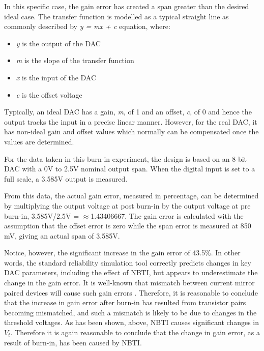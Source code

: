 \documentclass[11pt,a4paper]{article}
\begin{document}
In this specific case, the gain error has created a span greater than the desired ideal case. The transfer function is modelled as a typical straight line as commonly described by \textit{y = mx + c} equation, where:

\begin{itemize}
\item \textit{y} is the output of the DAC

\item  \textit{m} is the slope of the transfer function

\item  \textit{x} is the input of the DAC

\item  \textit{c} is the offset voltage
\end{itemize}

Typically, an ideal DAC has a gain, \textit{m}, of 1 and an offset, \textit{c}, of 0 and hence the output tracks the input in a precise linear manner. However, for the real DAC, it has non-ideal gain and offset values which normally can be compensated once the values are determined.

For the data taken in this burn-in experiment, the design is based on an 8-bit DAC with a 0V to 2.5V nominal output span. When the digital input is set to a full scale, a 3.585V output is measured.

From this data, the actual gain error, measured in percentage, can be determined by multiplying the output voltage at post burn-in by the output voltage at pre burn-in, 3.585V/2.5V = $\approx$1.43406667. The gain error is calculated with the assumption that the offset error is zero while the span error is measured at 850 mV, giving an actual span of 3.585V.

Notice, however, the significant increase in the gain error of 43.5$\%$. In other words, the standard reliability simulation tool correctly predicts changes in key DAC parameters, including the effect of NBTI, but appears to underestimate the change in the gain error. It is well-known that mismatch between current mirror paired devices will cause such gain errors \cite{Agostinelli}. Therefore, it is reasonable to conclude that the increase in gain error after burn-in has resulted from transistor pairs becoming mismatched, and such a mismatch is likely to be due to changes in the threshold voltages. As has been shown, above, NBTI causes significant changes in $V_t$. Therefore it is again reasonable to conclude that the change in gain error, as a result of burn-in, has been caused by NBTI.
\end{document}
